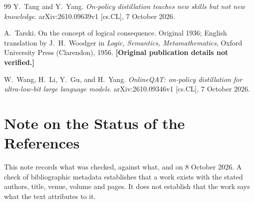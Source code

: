 \begin{thebibliography}{99}
 Y.~Tang and Y.~Yang. \emph{On-policy distillation teaches new skills but not new knowledge}. arXiv:2610.09639v1 [cs.CL], 7 October 2026.

 A.~Tarski. On the concept of logical consequence. Original 1936; English translation by J.~H.~Woodger in \emph{Logic, Semantics, Metamathematics}, Oxford University Press (Clarendon), 1956. \textbf{[Original publication details not verified.]}

 W.~Wang, H.~Li, Y.~Gu, and H.~Yang. \emph{OnlineQAT: on-policy distillation for ultra-low-bit large language models}. arXiv:2610.09346v1 [cs.CL], 7 October 2026.

\end{thebibliography}

\chapter*{Note on the Status of the References}

This note records what was checked, against what, and on 8 October 2026. A check of bibliographic metadata establishes that a work exists with the stated authors, title, venue, volume and pages. It does not establish that the work says what the text attributes to it.

